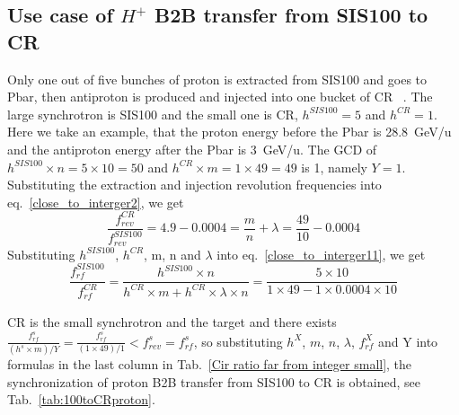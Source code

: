 \subsection{Use case of $H^{+}$ B2B transfer from SIS100 to CR} 
Only one out of five bunches of proton is extracted from SIS100 and goes to Pbar, then antiproton is produced and  injected into one bucket of CR ~\cite{steck_demonstration_2011}. The large synchrotron is SIS100 and the small one is CR, $h^{\mathit{SIS100}}=5$ and $h^{\mathit{CR}}=1$. Here we take an example, that the proton energy before the Pbar is \SI{28.8}{GeV/\atomicmassunit} and the antiproton energy after the Pbar is \SI{3}{GeV/\atomicmassunit}. The GCD of $h^{\mathit{SIS100}}\times n=5\times10=50$ and $h^{\mathit{CR}} \times m=1\times 49=49$ is 1, namely $Y=1$. Substituting the extraction and injection revolution frequencies into eq.~\ref{close_to_interger2}, we get
\begin{equation} 
\frac{f_{\mathit{rev}}^{\mathit{CR}}}{f_{\mathit{rev}}^{\mathit{SIS100}}}=4.9-0.0004=\frac{m}{n}+ \lambda=\frac{49}{10}-0.0004
\end{equation}
Substituting $h^{\mathit{SIS100}}$, $h^{\mathit{CR}}$, m, n and $\lambda$ into eq.~\ref{close_to_interger11}, we get
\begin{equation} 
\frac{f_{\mathit{rf}}^{\mathit{SIS100}}}{f_{\mathit{rf}}^{\mathit{CR}}}=\frac{h^{\mathit{SIS100}}\times n}{h^{\mathit{CR}} \times m+ h^{\mathit{CR}} \times\lambda\times n}=\frac{5\times 10}{1 \times 49- 1 \times0.0004\times 10}
\end{equation}

CR is the small synchrotron and the target and there exists $\frac{f_{\mathit{rf}}^{s}}{(h^s\times m)/Y}=\frac{f_{\mathit{rf}}^{s}}{(1\times 49)/1}<f_{\mathit{rev}}^{s}=f_{\mathit{rf}}^{s}$, so substituting $h^X$, $m$, $n$, $\lambda$, $f_{\mathit{rf}}^{X}$ and Y into formulas in the last column in Tab.~\ref{Cir ratio far from integer small}, the synchronization of proton B2B transfer from SIS100 to CR is obtained, see Tab.~\ref{tab:100toCRproton}.

